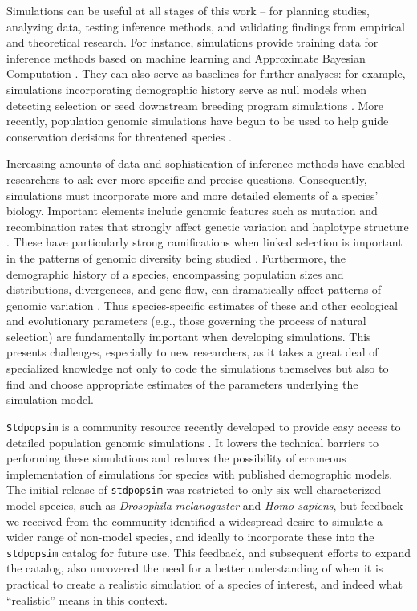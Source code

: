 \documentclass[hidelinks]{article}
\newcommand{\Stdpopsim}{\texttt{Stdpopsim}\xspace}
\newcommand{\stdpopsim}{\texttt{stdpopsim}\xspace}
\begin{document}
Simulations can be useful at all stages of this work --
for planning studies, analyzing data, testing inference methods,
and validating findings from empirical and theoretical research.
For instance, simulations provide training data
for inference methods based on machine learning \citep{Schrider2018} and
Approximate Bayesian Computation \citep{Csillery2010}. They can also serve as
baselines for further analyses: for example, simulations incorporating
demographic history serve as null models when detecting selection \citep{Hsieh2016a}
or seed downstream breeding program simulations \citep{Gaynor2020}.
More recently, population genomic simulations have begun
to be used to help guide conservation decisions for threatened species
\citep{Teixeira2021,kyriazis2022using}.

Increasing amounts of data and sophistication of inference methods
have enabled researchers to ask ever more
specific and precise questions. Consequently, simulations must incorporate
more and more detailed elements of a species' biology.
Important elements include genomic features such as mutation and recombination
rates that strongly affect genetic variation and haplotype structure
\citep{Nachman2002}. These have particularly strong ramifications 
when linked selection is important in the patterns of genomic diversity being studied \citep{Cutter2013}.
Furthermore, the demographic history of a species,
encompassing population sizes and distributions, divergences, and gene flow, can
dramatically affect patterns of genomic variation \citep{Teshima2006}. Thus
species-specific estimates of these and other ecological and evolutionary parameters 
(e.g., those governing the process of natural selection) 
are fundamentally important when developing simulations.
This presents challenges, especially to new researchers,
as it takes a great deal of specialized knowledge not only to code the simulations themselves
but also to find and choose appropriate estimates of the parameters underlying the simulation model.

\Stdpopsim is a community resource recently developed to provide easy
access to detailed population genomic simulations \citep{Adrion2020}. It
lowers the technical barriers to performing these simulations
and reduces the possibility of erroneous implementation of simulations
for species with published demographic models. 
The initial release of \stdpopsim was
restricted to only six well-characterized model species, such as
\emph{Drosophila melanogaster} and \emph{Homo sapiens},
but feedback we received from the community identified a widespread desire
to simulate a wider range of non-model species,
and ideally to incorporate these into the \stdpopsim catalog for future use.
This feedback, and subsequent efforts to expand the catalog, 
also uncovered the need for a better understanding of when it is practical to create a realistic
simulation of a species of interest, and indeed what ``realistic'' means in this context.
\end{document}
